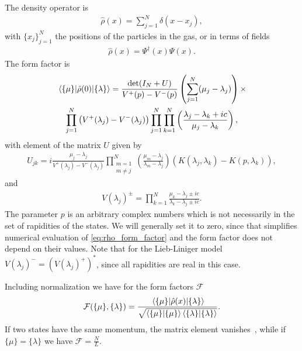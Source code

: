 \documentclass[11pt, a4paper]{report} %
\begin{document}
The density operator is~\cite{Nardis2015}
\begin{align}
  \hat{\rho}(x) = \sum_{j=1}^N \delta(x-x_j),
\end{align}
with \(\{x_j\}_{j=1}^N\) the positions of the particles in the gas, or in terms of fields~\cite{slavnov90_noneq_time_curren_correl_funct}
\begin{align}
  \label{eq:44}
  \hat{\rho}(x) = \Psi^{\dag}(x)\Psi(x).
\end{align}
The form factor is~\cite{slavnov90_noneq_time_curren_correl_funct, Nardis2015}
\begin{multline}
  \label{eq:rho_form_factor}
  \matrixel{\{\mu\}}{\hat{\rho}(0)}{\{\lambda\}} = \frac{\det(I_N +U)}{V^+(p) - V^-(p)}
  \left(\sum_{j=1}^N(\mu_j-\lambda_j)\right) \times\\ \prod_{j=1}^N\left(V^+(\lambda_j) - V^-(\lambda_j)\right)\prod_{j=1}^N\prod_{k=1}^N\left(\frac{\lambda_j-\lambda_k+ic}{\mu_j-\lambda_k}\right),
\end{multline}
with element of the matrix \(U\) given by
\begin{align}
  U_{jk} = i \frac{\mu_j-\lambda_j}{V^+(\lambda_j) -V^-(\lambda_j)}\prod_{\substack{m=1\\m\neq j}}^N \left(\frac{\mu_m - \lambda_j}{\lambda_m-\lambda_j}\right) \left(K(\lambda_j, \lambda_k) - K(p, \lambda_k)\right),
\end{align}
and 
\begin{align}
  \label{eq:56}
  V(\lambda_j)^{\pm} = \prod_{k=1}^N \frac{\mu_k-\lambda_j\pm ic}{\lambda_k-\lambda_j\pm ic}.
\end{align}
The parameter \(p\) is an arbitrary complex numbers which is not necessarily in the set of rapidities of the states.
We will generally set it to zero, since that simplifies numerical evaluation of \cref{eq:rho_form_factor} and the form factor does not depend on their values.
Note that for the Lieb-Liniger model \(V(\lambda_j)^{-} = (V(\lambda_j)^{+})^{*}\), since all rapidities are real in this case.

Including normalization we have for the form factors \(\mathcal{F}\)~\cite{Nardis2015}
\begin{align}
  \label{eq:21}
  \mathcal{F}(\{\mu\}, \{\lambda\}) = \frac{\matrixel{\{\mu\}}{\hat{\rho}(x)}{\{\lambda\}}}{\sqrt{\innerproduct{\{\mu\}}{\{\mu\}}\innerproduct{\{\lambda\}}{\{\lambda\}}}}.
\end{align}
If two states have the same momentum, the matrix element vanishes~\cite{slavnov90_noneq_time_curren_correl_funct}, while if $\{\mu\} = \{\lambda\}$ we have $\mathcal{F}=\frac{N}{L}$.
\end{document}
